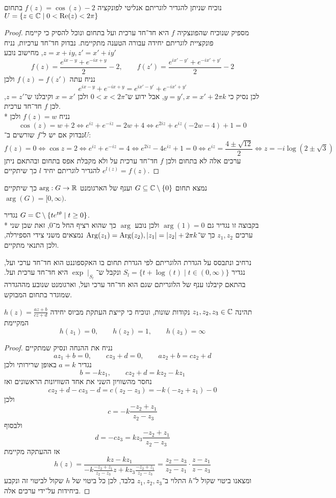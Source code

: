 \Question{}
נוכיח שניתן להגדיר לוגריתם אנליטי לפונקציה $f(z) = \cos(z) - 2$ בתחום $U = \{ z \in \mathbb{C} \mid 0 < \operatorname{Re}(z) < 2\pi \}$
\begin{proof}
	מספיק שנוכיח שהפונצקיה $f$ היא חד־חד ערכית ועל בתחום ונוכל להסיק כי קיימת פונקציית לוגריתם יחידה עבורה הטענה מתקיימת.
	נבדוק חד־חד ערכיות, נניח $z = x + iy, z' = x' + iy'$, מחישוב נובע
	\[
		f(z) = \frac{e^{ix - y} + e^{-ix + y}}{2} - 2,
		\qquad
		f(z') = \frac{e^{ix' - y'} + e^{-ix' + y'}}{2} - 2
	\]
	נניח עתה $f(z) = f(z')$ ולכן
	\[
		e^{ix - y} + e^{-ix + y} = e^{ix' - y'} + e^{-ix' + y'}
	\]
	לכן נסיק כי $y = y', x = x' + 2\pi k$, אבל ידוע ש־$0 < x < 2\pi$ ולכן $x = x'$ וקיבלנו ש־$z = z'$, לכן $f$ חד־חד ערכית. \\*
	נניח $f(z) = w$ ולכן
	\[
		\cos(z) = w + 2
		\iff
		e^{iz} + e^{-iz} = 2w + 4
		\iff
		e^{2 iz} + e^{iz} (-2w - 4) + 1 = 0
	\]
	נבדוק אם יש ל־$f$ שורשים ב־$U$:
	\[
		f(z) = 0 \iff \cos z = 2 \iff e^{iz} + e^{-iz} = 4 \iff e^{2 iz} - 4 e^{iz} + 1 = 0 \iff e^{iz} = \frac{4 \pm \sqrt{12}}{2} \iff z = -i \log(2 \pm \sqrt{3})
	\]
	ערכים אלה לא בתחום ולכן $f$ חד־חד ערכית על ולא מקבלת אפס בתחום ובהתאם ניתן להגדיר לוגריתם יחיד $l$ כך שיתקיים $e^{l(z)} = f(z)$.
\end{proof}

\Question{}
נמצא תחום $G \subseteq \mathbb{C} \setminus \{ 0 \}$ וענף של הארגומנט $\arg : G \to \mathbb{R}$ כך שיתקיים $\arg(G) = [0, \infty)$. %
\begin{solution}
	נגדיר $G = \mathbb{C} \setminus \{ t e^{t \theta} \mid t \ge 0 \}$. \\*
	בקבוצה זו נגדיר גם $\arg(1) = 0$ ולכן נובע $\arg$ כך שהוא רציף החל מ־$0$, זאת שכן שני ערכים $z_1, z_2$ כך ש־$\operatorname{Arg}(z_1) = \operatorname{Arg}(z_2), |z_1| = |z_2| + 2\pi k$ נמצאים משני צידי הספירלה, ולכן התנאי מתקיים.

	נרחיב ונתבסס על הגדרת הלוגריתם לפי הגדרת תחום בו האקספוננט הוא חד־חד ערכי ועל, נגדיר $S_l = \{ t + \log(t) \mid t \in (0, \infty) \}$ ונקבל ש־$\exp \mid_{S_l}$ היא חד־חד ערכית ועל.
	בהתאם קיבלנו ענף של הלוגריתם שגם הוא חד־חד ערכי ועל, וארגומנט שנובע מההגדרה שמוגדר בתחום המבוקש.
\end{solution}

\Question{}
\Subquestion{}
תהינה $z_1, z_2, z_3 \in \mathbb{C}$ נקודות שונות, ונוכיח כי קייצת העתקת מביוס יחידה $h(z) = \frac{az + b}{cz + d}$ המקיימת
\[
	h(z_1) = 0,
	\qquad
	h(z_2) = 1,
	\qquad
	h(z_3) = \infty
\]
\begin{proof}
	נניח את ההנחה ונסיק שמתקיים
	\[
		a z_1 + b = 0,
		\qquad
		c z_3 + d = 0,
		\qquad
		a z_2 + b = c z_2 + d
	\]
	נגדיר $a = k$ באופן שרירותי ולכן
	\[
		b = - k z_1,
		\qquad
		c z_2 + d = k z_2 - k z_1
	\]
	נחסר מהשוויון השני את אחד השוויונות הראשונים ואז
	\[
		c z_2 + d - c z_3 - d = c(z_2 - z_3) = -k (-z_2 + z_1) - 0
	\]
	ולכן
	\[
		c = -k \frac{-z_2 + z_1}{z_2 - z_3}
	\]
	ולבסוף
	\[
		d = -c z_3 = k z_3 \frac{-z_2 + z_1}{z_2 - z_3}
	\]
	אז ההעתקה מקיימת
	\[
		h(z)
		= \frac{k z - k z_1}{-k \frac{-z_2 + z_1}{z_2 - z_3} z + k z_3 \frac{-z_2 + z_1}{z_2 - z_3}}
		= \frac{z_2 - z_3}{z_2 - z_1} \cdot \frac{z - z_1}{z - z_3}
	\]
	ומצאנו ביטוי שקול ל־$h$ התלוי ב־$z_1, z_2, z_3$ בלבד, לכן כל ביטוי של $h$ שקול לביטוי זה ונקבע ביחידות על־ידי ערכים אלה.
\end{proof}

